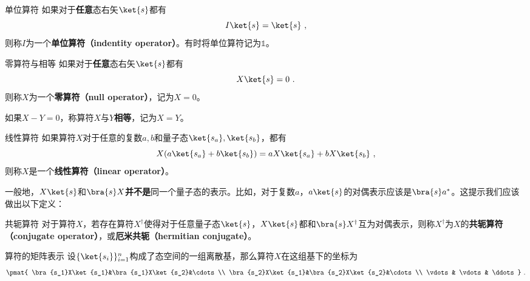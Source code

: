\begin{definition}{单位算符}\label{def_QMPrcp_9}
如果对于\textbf{任意}态右矢$\ket{s}$都有
\begin{equation}
I\ket{s} = \ket{s}~,
\end{equation}
则称$I$为一个\textbf{单位算符（indentity operator）}。有时将单位算符记为$\mathbb{1}$。
\end{definition}


\begin{definition}{零算符与相等}\label{def_QMPrcp_10}
如果对于\textbf{任意}态右矢$\ket{s}$都有
\begin{equation}
X\ket{s} = 0~.
\end{equation}
则称$X$为一个\textbf{零算符（null operator）}，记为$X=0$。

如果$X-Y=0$，称算符$X$与$Y$\textbf{相等}，记为$X=Y$。
\end{definition}



\begin{definition}{线性算符}\label{def_QMPrcp_11}
如果算符$X$对于任意的复数$a, b$和量子态$\ket{s_a}, \ket{s_b}$，都有
\begin{equation}
X(a\ket{s_a}+b\ket{s_b}) = aX\ket{s_a}+bX\ket{s_b}~,
\end{equation}
则称$X$是一个\textbf{线性算符（linear operator）}。
\end{definition}

一般地，$X\ket{s}$和$\bra{s}X$\textbf{并不是}同一个量子态的表示。比如，对于复数$a$，$a\ket{s}$的对偶表示应该是$\bra{s}a^*$。这提示我们应该做出以下定义：

\begin{definition}{共轭算符}\label{def_QMPrcp_5}
对于算符$X$，若存在算符$X^\dagger$使得对于任意量子态$\ket{s}$，$X\ket{s}$都和$\bra{s}X^\dagger$互为对偶表示，则称$X^\dagger$为$X$的\textbf{共轭算符（conjugate operator）}，或\textbf{厄米共轭（hermitian conjugate）}。
\end{definition}


\begin{theorem}{算符的矩阵表示}\label{the_QMPrcp_1}
设$\{\ket{s_i}\}_{i=1}^n$构成了态空间的一组离散基，那么算符$X$在这组基下的坐标为
\begin{equation}
\pmat{
    \bra{s_1}X\ket{s_1}&\bra{s_1}X\ket{s_2}&\cdots\\
    \bra{s_2}X\ket{s_1}&\bra{s_2}X\ket{s_2}&\cdots\\
    \vdots & \vdots& \ddots
}~.
\end{equation}
\end{theorem}

